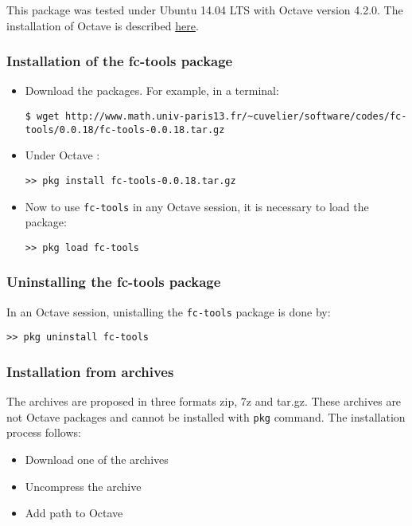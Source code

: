 This package was tested under Ubuntu 14.04 LTS with Octave version 4.2.0. The installation of Octave is described 
\href{http://www.math.univ-paris13.fr/~cuvelier/Octave.html}{here}.

\subsubsection{Installation of the fc-tools package}

\begin{itemize}
\item Download the packages. For example, in a terminal:
\begin{verbatim}
$ wget http://www.math.univ-paris13.fr/~cuvelier/software/codes/fc-tools/0.0.18/fc-tools-0.0.18.tar.gz
\end{verbatim}
\item Under Octave :
\begin{verbatim}
>> pkg install fc-tools-0.0.18.tar.gz
\end{verbatim}
\item Now to use \texttt{fc-tools} in any Octave session, it is necessary to load the package:
\begin{verbatim}
>> pkg load fc-tools
\end{verbatim}
\end{itemize}

\subsubsection{Uninstalling the fc-tools package}
In an Octave session, unistalling the \texttt{fc-tools} package is done by:
\begin{verbatim}
>> pkg uninstall fc-tools
\end{verbatim}

\subsubsection{Installation from archives}
The archives are proposed in three formats zip, 7z and tar.gz. These archives are not Octave packages and cannot be installed with \texttt{pkg} command.
The installation process follows:
\begin{itemize}
\item Download one of the archives
\item Uncompress the archive
\item Add path to Octave
\end{itemize}

